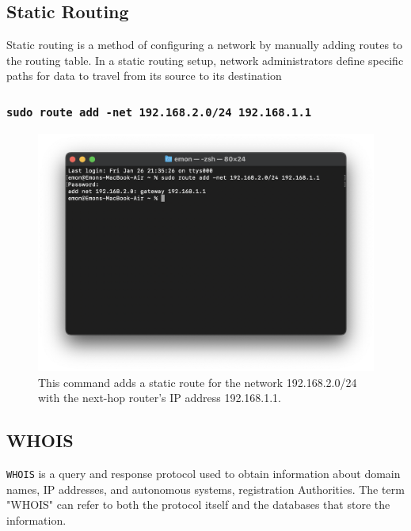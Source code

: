 \documentclass[11pt]{article}
\newcommand{\terminal}[1]{\texttt{\color{terminalcolor}#1}}
\begin{document}
\newpage

\subsection{Static Routing}
Static routing is a method of configuring a network by manually adding routes to the routing table. In a static routing setup, network administrators define specific paths for data to travel from its source to its destination
\subsubsection{\terminal{sudo route add -net 192.168.2.0/24 192.168.1.1}}
\begin{figure}[!h]
    \centering
    \includegraphics[width=\textwidth]{static_routing.png}
    \caption{This command adds a static route for the network 192.168.2.0/24 with the next-hop router's IP address 192.168.1.1.}
\end{figure}

\newpage

\subsection{WHOIS}
\terminal{WHOIS} is a query and response protocol used to obtain information about domain names, IP addresses, and autonomous systems, registration Authorities. The term "WHOIS" can refer to both the protocol itself and the databases that store the information.
\end{document}
